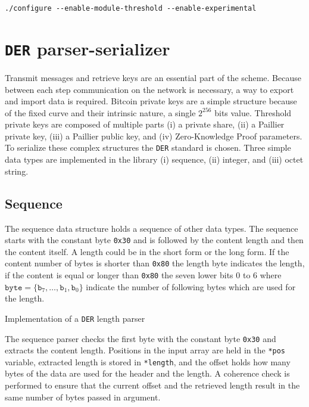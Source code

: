 \begin{verbatim}
./configure --enable-module-threshold --enable-experimental
\end{verbatim}


\section{\texttt{DER} parser-serializer}

Transmit messages and retrieve keys are an essential part of the scheme. Because
between each step communication on the network is necessary, a way to export
and import data is required. Bitcoin private keys are a simple structure because
of the fixed curve and their intrinsic nature, a single $2^{256}$ bits value.
Threshold private keys are composed of multiple parts (i) a private
share, (ii) a Paillier private key, (iii) a Paillier public key, and (iv)
Zero-Knowledge Proof parameters. To serialize these complex structures the
\texttt{DER} standard is chosen. Three simple data types are implemented in the
library (i) sequence, (ii) integer, and (iii) octet string.

\subsection{Sequence}

The sequence data structure holds a sequence of other data types.
The sequence starts with the constant byte \texttt{0x30} and is followed by the
content length and then the content itself. A length could be in the short form or
the long form. If the content number of bytes is shorter than \texttt{0x80} the
length byte indicates the length, if the content is equal or longer than
\texttt{0x80} the seven lower bits 0 to 6 where $\texttt{byte} = \{
\texttt{b}_7, \dots, \texttt{b}_1, \texttt{b}_0\}$ indicate the number of
following bytes which are used for the length.

\begin{listing}
	\caption{Implementation of a \texttt{DER} length parser}
	\label{lst:implDERLengthParser}
\end{listing}

The sequence parser checks the first byte with the constant byte \texttt{0x30} and
extracts the content length. Positions in the input array are held in the
\texttt{*pos} variable, extracted length is stored in \texttt{*length}, and the
offset holds how many bytes of the data are used for the header and the length.
A coherence check is performed to ensure that the current offset and the
retrieved length result in the same number of bytes passed in argument.

